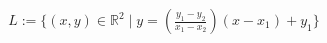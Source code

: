\documentclass[preview]{standalone}
\begin{document}
\begin{align*}
L := \{ (x,y) \in \mathbb{R}^{2} \mid y = (\frac{y_{1}-y_{2}}{x_{1}-x_{2}}) (x-x_{1}) + y_{1} \}
\end{align*}
\end{document}
